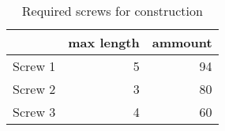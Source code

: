 \begin{table}[h!]
\centering
\caption{Required screws for construction}
\begin{tabular}{lrr}
\toprule
{} &  max length &  ammount \\
\midrule
Screw 1 &           5 &       94 \\
Screw 2 &           3 &       80 \\
Screw 3 &           4 &       60 \\
\bottomrule
\end{tabular}
\end{table}
